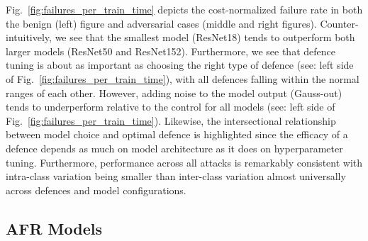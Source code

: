 
Fig.~\ref{fig:failures_per_train_time} depicts the cost-normalized failure rate in both the benign (left) figure and adversarial cases (middle and right figures). Counter-intuitively, we see that the smallest model (ResNet18) tends to outperform both larger models (ResNet50 and ResNet152). Furthermore, we see that defence tuning is about as important as choosing the right type of defence (see: left side of Fig.~\ref{fig:failures_per_train_time}), with all defences falling within the normal ranges of each other. However, adding noise to the model output (Gauss-out) tends to underperform relative to the control for all models (see: left side of Fig.~\ref{fig:failures_per_train_time}). Likewise, the intersectional relationship between model choice and optimal defence is highlighted since the efficacy of a defence depends as much on model architecture as it does on hyperparameter tuning.  Furthermore, performance across all attacks is remarkably consistent with intra-class variation being smaller than inter-class variation almost universally across defences and model configurations. 



\subsection{AFR Models}

